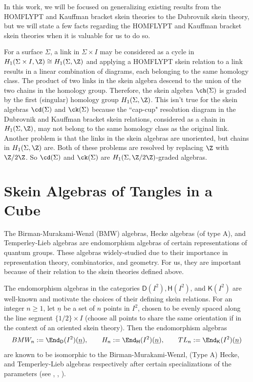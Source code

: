 In this work, we will be focused on generalizing existing results from the HOMFLYPT and Kauffman bracket skein theories to the Dubrovnik skein theory, but we will state a few facts regarding the HOMFLYPT and Kauffman bracket skein theories when it is valuable for us to do so. 

\begin{remark}
For a surface $\Sigma$, a link in $\Sigma \times I$ may be considered as a cycle in $H_1(\Sigma \times I, \Z) \cong H_1(\Sigma, \Z)$ and applying a HOMFLYPT skein relation to a link results in a linear combination of diagrams, each belonging to the same homology class. The product of two links in the skein algebra descend to the union of the two chains in the homology group. Therefore, the skein algebra $\ch(\Sigma)$ is graded by the first (singular) homology group $H_1(\Sigma, \Z)$. This isn't true for the skein algebras $\cd(\Sigma)$ and $\ck(\Sigma)$ because the ``cap-cup" resolution diagram in the Dubrovnik and Kauffman bracket skein relations, considered as a chain in $H_1(\Sigma, \Z)$, may not belong to the same homology class as the original link. Another problem is that the links in the skein algebras are unoriented, but chains in $H_1(\Sigma, \Z)$ are. Both of these problems are resolved by replacing $\Z$ with $\Z/2\Z$. So $\cd(\Sigma)$ and $\ck(\Sigma)$ are $H_1(\Sigma, \Z/2\Z)$-graded algebras. 
\end{remark}

\section{Skein Algebras of Tangles in a Cube} \label{sec:cube}

The Birman-Murakami-Wenzl (BMW) algebras, Hecke algebras (of type A), and Temperley-Lieb algebras are endomorphism algebras of certain representations of quantum groups. These algebras widely-studied due to their importance in representation theory, combinatorics, and geometry. For us, they are important because of their relation to the skein theories defined above. 

The endomorphism algebras in the categories $\mathsf{D}(I^2), \mathsf{H}(I^2)$, and $\mathsf{K}(I^2)$ are well-known and motivate the choices of their defining skein relations. For an integer $n \geq 1$, let $\underline{n}$ be a set of $n$ points in $I^2$, chosen to be evenly spaced along the line segment $\{ 1/2 \} \times I$ (choose all points to share the same orientation if in the context of an oriented skein theory). Then the endomorphism algebras 
\[
BMW_n := \End_\mathsf{D}(I^2)(\underline{n}), \qquad H_n := \End_\mathsf{H}(I^2)(\underline{n}), \qquad TL_n := \End_\mathsf{K}(I^2)(\underline{n})
\]
are known to be isomorphic to the Birman-Murakami-Wenzl, (Type A) Hecke, and Temperley-Lieb algebras respectively after certain specializations of the parameters (see \cite{Abr08}, \cite{AM98}, \cite{Mor10}).

